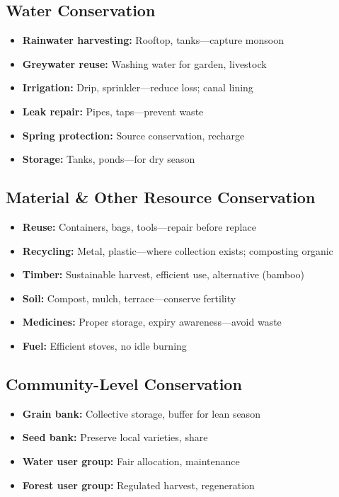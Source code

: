 \documentclass[11pt,a4paper]{article}
\begin{document}
\subsection{Water Conservation}
\begin{itemize}
    \item \textbf{Rainwater harvesting:} Rooftop, tanks---capture monsoon
    \item \textbf{Greywater reuse:} Washing water for garden, livestock
    \item \textbf{Irrigation:} Drip, sprinkler---reduce loss; canal lining
    \item \textbf{Leak repair:} Pipes, taps---prevent waste
    \item \textbf{Spring protection:} Source conservation, recharge
    \item \textbf{Storage:} Tanks, ponds---for dry season
\end{itemize}

\subsection{Material \& Other Resource Conservation}
\begin{itemize}
    \item \textbf{Reuse:} Containers, bags, tools---repair before replace
    \item \textbf{Recycling:} Metal, plastic---where collection exists; composting organic
    \item \textbf{Timber:} Sustainable harvest, efficient use, alternative (bamboo)
    \item \textbf{Soil:} Compost, mulch, terrace---conserve fertility
    \item \textbf{Medicines:} Proper storage, expiry awareness---avoid waste
    \item \textbf{Fuel:} Efficient stoves, no idle burning
\end{itemize}

\subsection{Community-Level Conservation}
\begin{itemize}
    \item \textbf{Grain bank:} Collective storage, buffer for lean season
    \item \textbf{Seed bank:} Preserve local varieties, share
    \item \textbf{Water user group:} Fair allocation, maintenance
    \item \textbf{Forest user group:} Regulated harvest, regeneration
\end{itemize}
\end{document}
